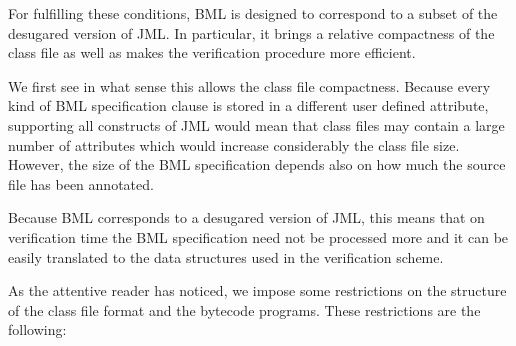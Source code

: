 \begin{itemize}
      For fulfilling these conditions, BML is designed to correspond to a subset of the desugared version of JML.
      In particular, it brings a relative compactness of the class
      file as well as makes the verification procedure more efficient. 
	   
      We first see in what sense this allows the class file compactness. 
      Because every kind of BML specification clause is
      stored in a different user defined attribute, supporting all constructs of JML would 
      mean that class files may contain a large number of attributes which would increase
      considerably the class file size. However, the size of the BML specification depends
      also on how much the source file has been annotated. 
      
      Because BML corresponds to a desugared version of JML, this means that on verification time the BML specification need not
      be processed more and it can be easily translated to the data structures used in the verification scheme.
      
\end{itemize}



As the attentive reader has noticed, we impose some restrictions on the structure of the class file format and the bytecode programs.
These restrictions are the following:
 


